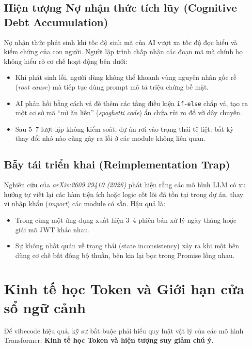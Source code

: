 \documentclass[a4paper,11pt]{article}
\begin{document}
\subsection{Hiện tượng Nợ nhận thức tích lũy (Cognitive Debt Accumulation)}
Nợ nhận thức phát sinh khi tốc độ sinh mã của AI vượt xa tốc độ đọc hiểu và kiểm chứng của con người. Người lập trình chấp nhận các đoạn mã mà chính họ không hiểu rõ cơ chế hoạt động bên dưới:
\begin{itemize}[leftmargin=1.5em]
    \item Khi phát sinh lỗi, người dùng không thể khoanh vùng nguyên nhân gốc rễ (\textit{root cause}) mà tiếp tục dùng prompt mô tả triệu chứng bề mặt.
    \item AI phản hồi bằng cách vá đè thêm các tầng điều kiện \texttt{if-else} chắp vá, tạo ra một cơ sở mã ``mì ăn liền'' (\textit{spaghetti code}) ẩn chứa rủi ro đổ vỡ dây chuyền.
    \item Sau 5--7 lượt lặp không kiểm soát, dự án rơi vào trạng thái tê liệt: bất kỳ thay đổi nhỏ nào cũng gây ra lỗi ở các module không liên quan.
\end{itemize}

\subsection{Bẫy tái triển khai (Reimplementation Trap)}
Nghiên cứu của \textit{arXiv:2609.29410 (2026)} phát hiện rằng các mô hình LLM có xu hướng tự viết lại các hàm tiện ích hoặc logic cốt lõi đã tồn tại trong dự án, thay vì nhập khẩu (\textit{import}) các module có sẵn. Hậu quả là:
\begin{itemize}[leftmargin=1.5em]
    \item Trong cùng một ứng dụng xuất hiện 3--4 phiên bản xử lý ngày tháng hoặc giải mã JWT khác nhau.
    \item Sự không nhất quán về trạng thái (state inconsistency) xảy ra khi một bên dùng cơ chế bất đồng bộ thuần, bên kia lại bọc trong Promise lồng nhau.
\end{itemize}

\section{Kinh tế học Token và Giới hạn cửa sổ ngữ cảnh}

Để vibecode hiệu quả, kỹ sư bắt buộc phải hiểu quy luật vật lý của các mô hình Transformer: \textbf{Kinh tế học Token và hiện tượng suy giảm chú ý}.
\end{document}
